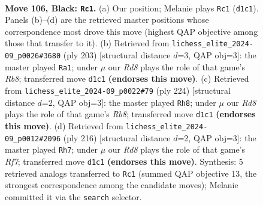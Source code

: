 \documentclass[11pt]{article}
\begin{document}
\clearpage

\begin{figure}[p]\centering
\begin{subfigure}{0.46\textwidth}\centering
\resizebox{\linewidth}{!}{%
\newchessgame
\chessboard[
  setfen={8/5k2/8/8/8/r7/4R1K1/3r4 b - - 23 106},
  showmover=false,
  pgfstyle=straightmove, color=movearrow, markmove={d1-c1}
]}
\caption{}
\end{subfigure}\hfill
\begin{subfigure}{0.46\textwidth}\centering
\resizebox{\linewidth}{!}{%
\newchessgame
\chessboard[
  setfen={8/8/8/8/3k4/8/2R3K1/1r6 b - - 56 102},
  showmover=false,
  pgfstyle=straightmove, color=movearrow, markmove={b1-a1}
]}
\caption{}
\end{subfigure}
\\[4pt]
\begin{subfigure}{0.46\textwidth}\centering
\resizebox{\linewidth}{!}{%
\newchessgame
\chessboard[
  setfen={1R6/8/3K4/8/8/8/8/k1r5 w - - 94 113},
  showmover=false,
  pgfstyle=straightmove, color=movearrow, markmove={b8-h8}
]}
\caption{}
\end{subfigure}\hfill
\begin{subfigure}{0.46\textwidth}\centering
\resizebox{\linewidth}{!}{%
\newchessgame
\chessboard[
  setfen={2k5/5R2/8/2r5/8/8/3K4/8 w - - 95 109},
  showmover=false,
  pgfstyle=straightmove, color=movearrow, markmove={f7-h7}
]}
\caption{}
\end{subfigure}
\caption{\textbf{Move 106, Black: \texttt{Rc1}.} (a) Our position; Melanie plays \texttt{Rc1} (\texttt{d1c1}). Panels (b)--(d) are the retrieved master positions whose correspondence most drove this move (highest QAP objective among those that transfer to it). (b) Retrieved from \texttt{lichess\_elite\_2024-09\_p0026\#3680} (ply 203) [structural distance $d$=3, QAP obj=3]: the master played \texttt{Ra1}; under $\mu$ our \emph{Rd8} plays the role of that game's \emph{Rb8}; transferred move \texttt{d1c1} \textbf{(endorses this move)}. (c) Retrieved from \texttt{lichess\_elite\_2024-09\_p0022\#79} (ply 224) [structural distance $d$=2, QAP obj=3]: the master played \texttt{Rh8}; under $\mu$ our \emph{Rd8} plays the role of that game's \emph{Rb8}; transferred move \texttt{d1c1} \textbf{(endorses this move)}. (d) Retrieved from \texttt{lichess\_elite\_2024-09\_p0012\#2096} (ply 216) [structural distance $d$=2, QAP obj=3]: the master played \texttt{Rh7}; under $\mu$ our \emph{Rd8} plays the role of that game's \emph{Rf7}; transferred move \texttt{d1c1} \textbf{(endorses this move)}. Synthesis: 5 retrieved analogs transferred to \texttt{Rc1} (summed QAP objective 13, the strongest correspondence among the candidate moves); Melanie committed it via the \texttt{search} selector.}
\label{fig:thought-m211}
\end{figure}
\end{document}
